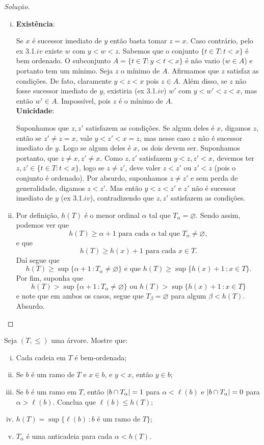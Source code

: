 \documentclass[a4paper]{article}
\begin{document}
\begin{proof}[Solução]
\begin{enumerate}[(i)]
  \item \textbf{Existência}:
\par
Se $x$ é sucessor imediato de $y$ então basta tomar $z=x$. Caso contrário, pelo ex 3.1.$iv$ existe $w$ com $y < w < z$.
Sabemos que o conjunto $\{t \in T : t < x\}$ é bem ordenado. O subconjunto $A = \{ t \in T : y < t < x\}$ é não vazio ($w \in A$) e portanto tem um mínimo. Seja $z$ o mínimo de $A$. Afirmamos que $z$ satisfaz as condições. De fato, claramente $y < z < x$ pois $z \in A$. Além disso, se $z$ não fosse sucessor imediato de $y$, existiria (ex 3.1.$iv$) $w'$ com $y< w'<z<x$, mas então $w' \in A$. Impossível, pois $z$ é o mínimo de $A$.\\
\textbf{Unicidade}:
\par
Suponhamos que $z,z'$ satisfazem as condições. Se algum deles é $x$, digamos $z$, então se $z' \neq z = x$, vale $y < z' < x= z$, mas nesse caso $z$ não é sucessor imediato de $y$. Logo se algum deles é $x$, os dois devem ser. Suponhamos portanto, que $z \neq x, z' \neq x$. Como $z,z'$ satisfazem $y < z, z' < x$, devemos ter $z,z' \in \{t \in T:t <x\}$, logo se $z \neq z'$, deve valer $z < z'$ ou $z' < z$ (pois o conjunto é ordenado). Por absurdo, suponhamos $z \neq z'$ e sem perda de generalidade, digamos $z < z'$. Mas então $y < z < z'$ e $z'$ não é sucessor imediato de $y$ (ex 3.1.$iv$), contradizendo que $z,z'$ satisfazem as condições.

  \item  Por definição, \(h(T)\) é o menor ordinal
    \(\alpha\) tal que \(T_\alpha=\varnothing\). Sendo assim, podemos ver que
    \[h(T)\geq \alpha +1 \text{ para cada } \alpha \text{ tal que }
      T_\alpha\not=\varnothing,\]
    e que
    \[h(T)\geq h(x)+1\text{ para cada } x\in T.\]
    Daí segue que
    \[h(T)\geq \sup\{\alpha+1\,\colon T_\alpha\not=\varnothing\}\text{ e que }
      h(T)\geq\sup\{h(x)+1\,\colon x\in T\}.\]
    Por fim, suponha que
    \[h(T)> \sup\{\alpha+1\,\colon T_\alpha\not=\varnothing\}\text{ ou } h(T)
      >\sup\{h(x)+1\,\colon x\in T\}\]
    e note que em ambos os casos, segue que \(T_\beta=\varnothing\) para algum \(\beta<
    h(T)\). Absurdo.\qedhere
\end{enumerate}
\end{proof}
\begin{exercicio}
    Seja \((T,\leq)\) uma árvore. Mostre que:
    \begin{enumerate}[(i)]
    \item Cada cadeia em \(T\) é bem-ordenada;
    \item Se \(b\) é um ramo de \(T\) e \(x\in b\), e \(y<x\), então \(y\in b\);
    \item Se \(b\) é um ramo em \(T\), então \(\vert b\cap T_\alpha \vert=1\) para
      \(\alpha <\ell (b)\) e \(\vert b\cap T_\alpha \vert=0\) para \(\alpha
      >\ell (b)\). Conclua que \(\ell (b)\leq h(T)\);
    \item \(h(T)=\sup\{\ell (b)\,\colon b \text{ é um ramo de } T\}\);
    \item \(T_\alpha\) é uma anticadeia para cada \(\alpha < h(T)\).
     \end{enumerate}
  \end{exercicio}
\end{document}
